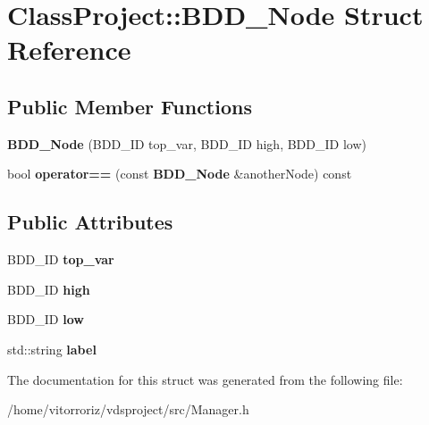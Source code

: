 \section{Class\+Project\+:\+:B\+D\+D\+\_\+\+Node Struct Reference}
\label{structClassProject_1_1BDD__Node}
\subsection*{Public Member Functions}
\begin{DoxyCompactItemize}
\item 
{\bfseries B\+D\+D\+\_\+\+Node} (B\+D\+D\+\_\+\+ID top\+\_\+var, B\+D\+D\+\_\+\+ID high, B\+D\+D\+\_\+\+ID low)\label{structClassProject_1_1BDD__Node_a8081a46d1265133ec53872a1ca4c9544}

\item 
bool {\bfseries operator==} (const {\bf B\+D\+D\+\_\+\+Node} \&another\+Node) const \label{structClassProject_1_1BDD__Node_a8ab49d60c871a5fe484492b2a5f0bec8}

\end{DoxyCompactItemize}
\subsection*{Public Attributes}
\begin{DoxyCompactItemize}
\item 
B\+D\+D\+\_\+\+ID {\bfseries top\+\_\+var}\label{structClassProject_1_1BDD__Node_a334b891f34eac8419a6402c6e7c730dd}

\item 
B\+D\+D\+\_\+\+ID {\bfseries high}\label{structClassProject_1_1BDD__Node_a1b094c78ca5aabfbf8b2ca3908ebc0d8}

\item 
B\+D\+D\+\_\+\+ID {\bfseries low}\label{structClassProject_1_1BDD__Node_a263243c7dc98c163f1b6f076cc948a2c}

\item 
std\+::string {\bfseries label}\label{structClassProject_1_1BDD__Node_ab308e58613354cb665a94a12b11782ee}

\end{DoxyCompactItemize}


The documentation for this struct was generated from the following file\+:\begin{DoxyCompactItemize}
\item 
/home/vitorroriz/vdsproject/src/Manager.\+h\end{DoxyCompactItemize}
